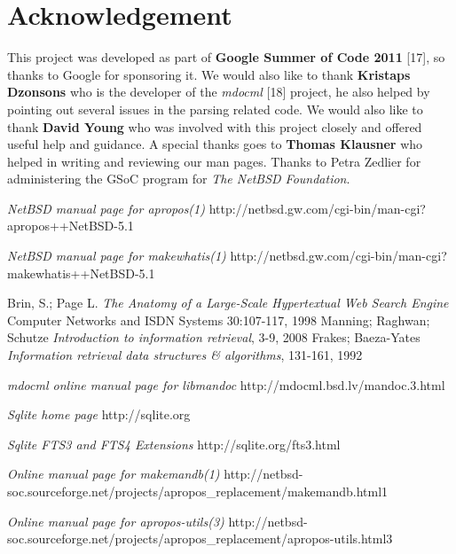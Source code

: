\documentclass[titlepage, a4paper, 12pt]{article}
\begin{document}
\section{Acknowledgement}
This project was developed as part of \textbf{Google Summer of Code 2011} [17],
so thanks to Google for sponsoring it. We would also like to thank
\textbf{Kristaps Dzonsons} who is the developer of the \textit{mdocml} [18]
project, he also helped by pointing out several issues in the parsing related
code. We would also like to thank \textbf{David Young} who was involved with
this project closely and offered useful help and guidance. A special thanks goes
to \textbf{Thomas Klausner} who helped in writing and reviewing our man pages.
Thanks to Petra Zedlier for administering the GSoC program for \textit{The NetBSD
Foundation}.
\begin{thebibliography}{20}
\emph{NetBSD manual page for apropos(1)}
\newline http://netbsd.gw.com/cgi-bin/man-cgi?apropos++NetBSD-5.1

\emph{NetBSD manual page for makewhatis(1)}
\newline http://netbsd.gw.com/cgi-bin/man-cgi?makewhatis++NetBSD-5.1

Brin, S.; Page L.
\emph{The Anatomy of a Large-Scale Hypertextual Web Search Engine}
Computer Networks and ISDN Systems
30:107-117, 1998
Manning; Raghwan; Schutze
\emph{Introduction to information retrieval},
3-9,
2008
Frakes; Baeza-Yates
\emph{Information retrieval data structures
\& algorithms},
131-161,
1992

\emph{mdocml online manual page for
libmandoc}
\newline http://mdocml.bsd.lv/mandoc.3.html

\emph{Sqlite home page}
\newline http://sqlite.org

\emph{Sqlite FTS3 and FTS4 Extensions}
\newline  http://sqlite.org/fts3.html

\emph{Online manual page for makemandb(1)}
\newline http://netbsd-soc.sourceforge.net/projects/apropos\_replacement/makemandb.html1

\emph{Online manual page for apropos-utils(3)}
\newline http://netbsd-soc.sourceforge.net/projects/apropos\_replacement/apropos-utils.html3


\end{thebibliography}
\end{document}

